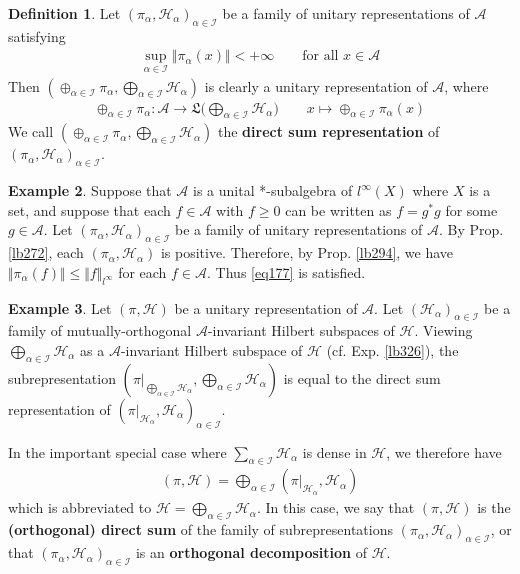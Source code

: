\documentclass[12pt,b5paper,notitlepage]{article}
\theoremstyle{definition}
\newtheorem{df}{Definition}[subsection]
\newtheorem{eg}[df]{Example}
\theoremstyle{plain}
\newcommand{\fk}{\mathfrak}
\newcommand{\MH}{\mathcal H}
\newcommand{\SI}{\mathscr I}
\newcommand{\SA}{\mathscr A}
\newcommand{\hqed}{\hfill\qedsymbol}
\numberwithin{equation}{section}
\begin{document}
\begin{df}
Let $(\pi_\alpha,\MH_\alpha)_{\alpha\in\SI}$ be a family of unitary representations of $\SA$ satisfying
\begin{align}\label{eq177}
\sup_{\alpha\in\SI}\Vert\pi_\alpha(x)\Vert<+\infty\qquad\text{for all }x\in\SA
\end{align}
Then $(\oplus_{\alpha\in\SI}\pi_\alpha,\bigoplus_{\alpha\in\SI}\MH_\alpha)$ is clearly a unitary representation of $\SA$, where
\begin{align*}
\oplus_{\alpha\in\SI}\pi_\alpha:\SA\rightarrow\fk L\Big(\bigoplus_{\alpha\in\SI}\MH_\alpha\Big)\qquad x\mapsto \oplus_{\alpha\in\SI}\pi_\alpha(x)
\end{align*}
We call $(\oplus_{\alpha\in\SI}\pi_\alpha,\bigoplus_{\alpha\in\SI}\MH_\alpha)$ the \textbf{direct sum representation}  of $(\pi_\alpha,\MH_\alpha)_{\alpha\in\SI}$.
\end{df}

\begin{eg}
Suppose that $\SA$ is a unital *-subalgebra of $l^\infty(X)$ where $X$ is a set, and suppose that each $f\in\SA$ with $f\geq0$ can be written as $f=g^*g$ for some $g\in\SA$. Let $(\pi_\alpha,\MH_\alpha)_{\alpha\in\SI}$ be a family of unitary representations of $\SA$. By Prop. \ref{lb272}, each $(\pi_\alpha,\MH_\alpha)$ is positive. Therefore, by Prop. \ref{lb294}, we have $\Vert\pi_\alpha(f)\Vert\leq \Vert f\Vert_{l^\infty}$ for each $f\in\SA$. Thus \eqref{eq177} is satisfied.
\end{eg}


\begin{eg}\label{lb327}
Let $(\pi,\MH)$ be a unitary representation of $\SA$. Let $(\MH_\alpha)_{\alpha\in\SI}$ be a family of mutually-orthogonal $\SA$-invariant Hilbert subspaces of $\MH$. Viewing $\bigoplus_{\alpha\in\SI}\MH_\alpha$ as a $\SA$-invariant Hilbert subspace of $\MH$ (cf. Exp. \ref{lb326}), the subrepresentation $(\pi|_{\bigoplus_{\alpha\in\SI}\MH_\alpha},\bigoplus_{\alpha\in\SI}\MH_\alpha)$ is equal to the direct sum representation of $(\pi|_{\MH_\alpha},\MH_\alpha)_{\alpha\in\SI}$. 

In the important special case where $\sum_{\alpha\in\SI}\MH_\alpha$ is dense in $\MH$, we therefore have
\begin{align}\label{eq178}
(\pi,\MH)=\bigoplus_{\alpha\in\SI}(\pi|_{\MH_\alpha},\MH_\alpha)
\end{align}
which is abbreviated to $\MH=\bigoplus_{\alpha\in\SI}\MH_\alpha$. In this case, we say that $(\pi,\MH)$ is the \textbf{(orthogonal) direct sum}  of the family of subrepresentations $(\pi_\alpha,\MH_\alpha)_{\alpha\in\SI}$, or that $(\pi_\alpha,\MH_\alpha)_{\alpha\in\SI}$ is an \textbf{orthogonal decomposition}  of $\MH$.  \hqed
\end{eg}
\end{document}
